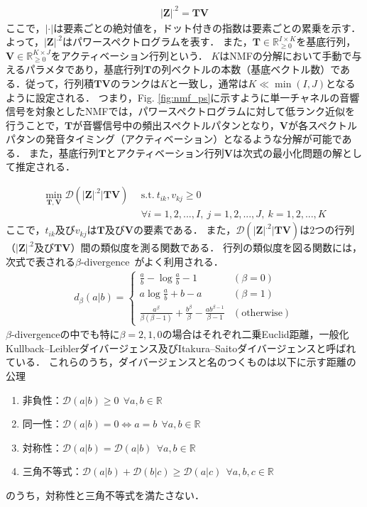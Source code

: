 \begin{align}
    |\bm{Z}|^{.2} = \bm{TV}
\end{align}
ここで，$| \cdot |$は要素ごとの絶対値を，ドット付きの指数は要素ごとの累乗を示す．よって，$|\bm{Z}|^{.2}$はパワースペクトログラムを表す．
また，$\bm{T} \in \mathbb{R}^{I \times K}_{\geq 0}$を基底行列，$\bm{V} \in \mathbb{R}^{K \times J}_{\geq 0}$をアクティベーション行列という．
$K$はNMFの分解において手動で与えるパラメタであり，基底行列$\bm{T}$の列ベクトルの本数（基底ベクトル数）である．従って，行列積$\bm{TV}$のランクは$K$と一致し，通常は$K \ll \min (I,J)$となるように設定される．
つまり，Fig. \ref{fig:nmf_ps}に示すように単一チャネルの音響信号を対象としたNMFでは，パワースペクトログラムに対して低ランク近似を行うことで，$\bm{T}$が音響信号中の頻出スペクトルパタンとなり，$\bm{V}$が各スペクトルパタンの発音タイミング（アクティベーション）となるような分解が可能である．
また，基底行列$\bm{T}$とアクティベーション行列$\bm{V}$は次式の最小化問題の解として推定される．

\begin{align}
    \nonumber \min_{\bm{T,V}} \mathcal{D}(|\bm{Z}|^{.2} | \bm{TV}) ~~ & \mathrm{s.t.} ~ t_{ik}, v_{kj} \geq 0 \\ &\forall i = 1, 2, ..., I, ~j = 1, 2, ..., J, ~k = 1, 2, ..., K 
\end{align}
ここで，$t_{ik}$及び$v_{kj}$は$\bm{T}$及び$\bm{V}$の要素である．
また，$ \mathcal{D}(|\bm{Z}|^{.2} | \bm{TV})$は2つの行列（$|\bm{Z}|^{.2}$及び$\bm{TV}$）間の類似度を測る関数である．
行列の類似度を図る関数には，次式で表される$\beta$-divergence~\cite{psi-div, ext_nmf}がよく利用される\cite{pssnmf}．
\begin{align}
  d_{\beta}(a|b) = \left\{ \begin{array}{lll}
    \displaystyle \frac{a}{b} - \log \frac{a}{b} -1 & (\beta = 0) \\
    a \log \displaystyle\frac{a}{b} + b - a & (\beta =1) \\
    \displaystyle \frac{a^{\beta}}{\beta (\beta -1)} + \frac{b^{\beta}}{\beta} - \frac{ab^{\beta - 1}} {\beta - 1} & (\mathrm{otherwise}) 
  \end{array} \right. \label{eq:betad}
\end{align}
$\beta$-divergenceの中でも特に$\beta= 2,1,0$の場合はそれぞれ二乗Euclid距離，一般化Kullback--Leiblerダイバージェンス及びItakura--Saitoダイバージェンスと呼ばれている．
これらのうち，ダイバージェンスと名のつくものは以下に示す距離の公理
\begin{enumerate}
  \item 非負性：$\mathcal{D}(a|b) \geq 0 ~~\forall a,b \in \mathbb{R}$
  \item 同一性：$\mathcal{D}(a|b) = 0 \Leftrightarrow a = b~~\forall a,b \in \mathbb{R}$
  \item 対称性：$\mathcal{D}(a|b)= \mathcal{D}(a|b) ~~\forall a,b \in \mathbb{R}$
  \item 三角不等式：$\mathcal{D}(a|b) + \mathcal{D}(b|c) \geq \mathcal{D}(a|c) ~~\forall a,b,c \in \mathbb{R}$
\end{enumerate}
のうち，対称性と三角不等式を満たさない．

